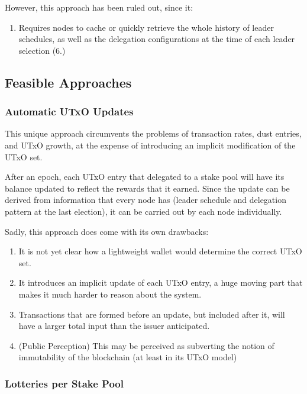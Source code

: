 \documentclass[11pt,a4paper,dvipsnames,twosided]{article}
\begin{document}
However, this approach has been ruled out, since it:

\begin{enumerate}
\item
  Requires nodes to cache or quickly retrieve the whole history of
  leader schedules, as well as the delegation configurations at the time
  of each leader selection (6.)
\end{enumerate}

\subsection{Feasible Approaches}
\label{feasible-approaches}

\subsubsection{Automatic UTxO Updates}
\label{automatic-utxo-updates}

This unique approach circumvents the problems of transaction rates, dust
entries, and UTxO growth, at the expense of introducing an implicit
modification of the UTxO set.

After an epoch, each UTxO entry that delegated to a stake pool will have
its balance updated to reflect the rewards that it earned. Since the
update can be derived from information that every node has (leader
schedule and delegation pattern at the last election), it can be carried
out by each node individually.

Sadly, this approach does come with its own drawbacks:

\begin{enumerate}
\item
  It is not yet clear how a lightweight wallet would determine the
  correct UTxO set.
\item
  It introduces an implicit update of each UTxO entry, a huge moving
  part that makes it much harder to reason about the system.
\item
  Transactions that are formed before an update, but included after it,
  will have a larger total input than the issuer anticipated.
\item
  (Public Perception) This may be perceived as subverting the notion of
  immutability of the blockchain (at least in its UTxO model)
\end{enumerate}

\subsubsection{Lotteries per Stake Pool}
\label{lotteries-per-stake-pool}
\end{document}

